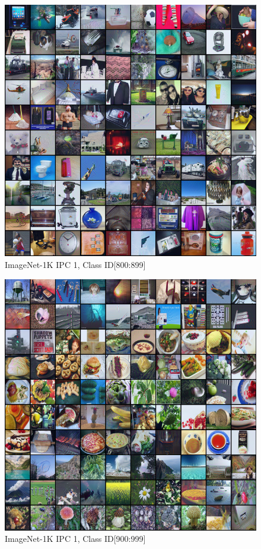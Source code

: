 \documentclass[10pt,twocolumn,letterpaper]{article}
\begin{document}
\begin{figure}
    \centering
    \includegraphics[width=\textwidth]{images/appendix/row-9-column-1.png}
    \caption{ImageNet-1K IPC 1, Class ID[800:899]}
\end{figure}
\begin{figure}
    \centering
    \includegraphics[width=\textwidth]{images/appendix/row-10-column-1.png}
    \caption{ImageNet-1K IPC 1, Class ID[900:999]}
\end{figure}
\end{document}

